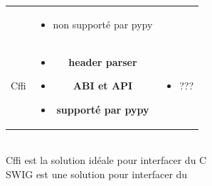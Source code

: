 \begin{frame}
\begin{center}
\begin{tabular}{ccc}
\begin{minipage}[t]{.2\linewidth}
\begin{itemize}
        \end{itemize}
      \end{minipage} &
      \begin{minipage}[t]{.45\linewidth}
        \tiny
        \begin{itemize}
          \item non supporté par pypy
        \end{itemize}
      \end{minipage} \\[1em]
      Cffi &
      \begin{minipage}[t]{.2\linewidth}
        \tiny
        \begin{itemize}
        \item \textbf{header parser}
        \item \textbf{ABI et API}
        \item \textbf{supporté par pypy}
        \end{itemize}
      \end{minipage} &
      \begin{minipage}[t]{.45\linewidth}
        \tiny
        \begin{itemize}
        \item ???
        \end{itemize}
      \end{minipage}
    \end{tabular} \\[1em]
    \alert{Cffi est la solution idéale pour interfacer du C} \\[.5em]
    \alert{SWIG est une solution pour interfacer du \Cpp}
  \end{center}
  \note{
    \begin{enumerate}
    \item
    \end{enumerate}
  }
\end{frame}

